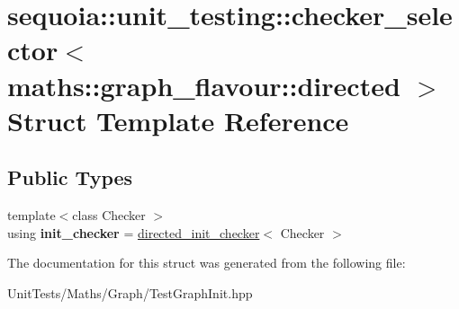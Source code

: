 \hypertarget{structsequoia_1_1unit__testing_1_1checker__selector_3_01maths_1_1graph__flavour_1_1directed_01_4}{}\section{sequoia\+::unit\+\_\+testing\+::checker\+\_\+selector$<$ maths\+::graph\+\_\+flavour\+::directed $>$ Struct Template Reference}
\label{structsequoia_1_1unit__testing_1_1checker__selector_3_01maths_1_1graph__flavour_1_1directed_01_4}
\subsection*{Public Types}
\begin{DoxyCompactItemize}
\item 
\mbox{\label{structsequoia_1_1unit__testing_1_1checker__selector_3_01maths_1_1graph__flavour_1_1directed_01_4_ac430c636dc942208ea0a452c3e6792f4}} 
{\footnotesize template$<$class Checker $>$ }\\using {\bfseries init\+\_\+checker} = \mbox{\hyperlink{classsequoia_1_1unit__testing_1_1directed__init__checker}{directed\+\_\+init\+\_\+checker}}$<$ Checker $>$
\end{DoxyCompactItemize}


The documentation for this struct was generated from the following file\+:\begin{DoxyCompactItemize}
\item 
Unit\+Tests/\+Maths/\+Graph/Test\+Graph\+Init.\+hpp\end{DoxyCompactItemize}
